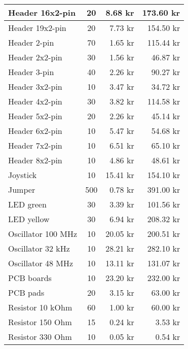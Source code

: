 \begin{longtable}{|l|c|r|r|}
    Header 16x2-pin         & 20     & 8.68 kr    & 173.60 kr   \\ \hline
    Header 19x2-pin         & 20     & 7.73 kr    & 154.50 kr   \\ \hline
    Header 2-pin            & 70     & 1.65 kr    & 115.44 kr   \\ \hline
    Header 2x2-pin          & 30     & 1.56 kr    & 46.87 kr    \\ \hline
    Header 3-pin            & 40     & 2.26 kr    & 90.27 kr    \\ \hline
    Header 3x2-pin          & 10     & 3.47 kr    & 34.72 kr    \\ \hline
    Header 4x2-pin          & 30     & 3.82 kr    & 114.58 kr   \\ \hline
    Header 5x2-pin          & 20     & 2.26 kr    & 45.14 kr    \\ \hline
    Header 6x2-pin          & 10     & 5.47 kr    & 54.68 kr    \\ \hline
    Header 7x2-pin          & 10     & 6.51 kr    & 65.10 kr    \\ \hline
    Header 8x2-pin          & 10     & 4.86 kr    & 48.61 kr    \\ \hline
    Joystick                & 10     & 15.41 kr   & 154.10 kr   \\ \hline
    Jumper                  & 500    & 0.78 kr    & 391.00 kr   \\ \hline
    LED green               & 30     & 3.39 kr    & 101.56 kr   \\ \hline
    LED yellow              & 30     & 6.94 kr    & 208.32 kr   \\ \hline
    Oscillator 100 MHz      & 10     & 20.05 kr   & 200.51 kr   \\ \hline
    Oscillator 32 kHz       & 10     & 28.21 kr   & 282.10 kr   \\ \hline
    Oscillator 48 MHz       & 10     & 13.11 kr   & 131.07 kr   \\ \hline
    PCB boards              & 10     & 23.20 kr   & 232.00 kr   \\ \hline
    PCB pads                & 20     & 3.15 kr    & 63.00 kr    \\ \hline
    Resistor 10 kOhm        & 60     & 1.00 kr    & 60.00 kr    \\ \hline
    Resistor 150 Ohm        & 15     & 0.24 kr    & 3.53 kr     \\ \hline
    Resistor 330 Ohm        & 10     & 0.05 kr    & 0.54 kr     \\ \hline

\end{longtable}
